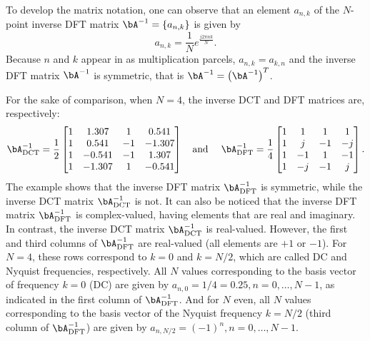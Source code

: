 To develop the matrix notation, one can observe that an element $a_{n,k}$ of the $N$-point inverse DFT matrix $\bA^{-1} = \{ a_{n,k} \}$ is given by
\begin{equation}
a_{n,k} = \frac{1}{N} e^{\frac {j2\pi n k} N}.
\label{eq:dft_matrix_element}
\end{equation}
Because $n$ and $k$ appear in  as multiplication parcels, $a_{n,k}=a_{k,n}$  
and the inverse DFT matrix $\bA^{-1}$ is symmetric, that is $\bA^{-1} = \left(\bA^{-1}\right)^T$.

For the sake of comparison, when $N=4$, the inverse DCT and DFT matrices are, respectively:
\[
\bA^{-1}_{\textrm{DCT}} = 
\frac{1}{2}
    \begin{bmatrix}
  1 &  1.307 & 1 & 0.541 \\
 1 &  0.541 & -1 & -1.307 \\
 1 &  -0.541 & -1 & 1.307 \\
 1 &  -1.307 & 1 & -0.541 \\
    \end{bmatrix}
\textrm{~~~and~~~~}
\bA^{-1}_{\textrm{DFT}} = 
\frac{1}{4}
    \begin{bmatrix}
    1 & 1 & 1 & 1\\
    1 & j & -1 & -j \\
    1 & -1 & 1 & -1 \\
    1 & -j & -1 & j \\
    \end{bmatrix}
.\]
The example shows that the inverse DFT matrix $\bA^{-1}_{\textrm{DFT}}$ is symmetric, while 
the inverse DCT matrix $\bA^{-1}_{\textrm{DCT}}$ is not.
It can also be noticed that the inverse DFT matrix $\bA^{-1}_{\textrm{DFT}}$ is complex-valued, having elements that are real and imaginary. In contrast,
the inverse DCT matrix $\bA^{-1}_{\textrm{DCT}}$ is real-valued.
However, the first and third columns of $\bA^{-1}_{\textrm{DFT}}$ are real-valued (all elements are $+1$ or $-1$). For $N=4$, these rows correspond to $k=0$ and $k=N/2$, which are called DC and Nyquist frequencies, respectively.
All $N$ values corresponding to the basis vector of frequency $k=0$ (DC) are given by $a_{n,0} = 1/4 = 0.25, n=0,\ldots,N-1$, as indicated
in the first column of $\bA^{-1}_{\textrm{DFT}}$. And for $N$ even, all $N$ values corresponding to the basis vector of the Nyquist frequency $k=N/2$ (third column of $\bA^{-1}_{\textrm{DFT}}$) are given by $a_{n,N/2} = (-1)^{n}, n=0,\ldots,N-1$.


